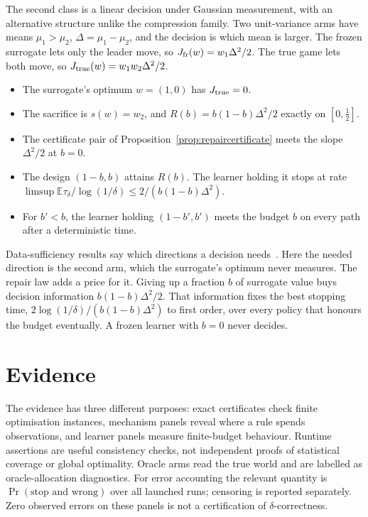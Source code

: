 The second class is a linear decision under Gaussian measurement, with an alternative
structure unlike the compression family. Two unit-variance arms have means $\mu_1>\mu_2$,
$\Delta=\mu_1-\mu_2$, and the decision is which mean is larger. The frozen surrogate lets only
the leader move, so $J_{\rm fr}(w)=w_1\Delta^2/2$. The true game lets both move, so
$J_{\rm true}(w)=w_1w_2\Delta^2/2$.

\begin{proposition}
\label{prop:twoarm}
\begin{itemize}
\item The surrogate's optimum $w=(1,0)$ has $J_{\rm true}=0$.
\item The sacrifice is $s(w)=w_2$, and $R(b)=b(1-b)\Delta^2/2$ exactly on $[0,\frac12]$.
\item The certificate pair of Proposition~\ref{prop:repaircertificate} meets the slope
$\Delta^2/2$ at $b=0$.
\item The design $(1-b,b)$ attains $R(b)$. The learner holding it stops at rate
$\limsup\mathbb E\tau_\delta/\log(1/\delta)\le2/(b(1-b)\Delta^2)$.
\item For $b'<b$, the learner holding $(1-b',b')$ meets the budget $b$ on every path after a
deterministic time.
\end{itemize}
\end{proposition}

Data-sufficiency results say which directions a decision needs~\cite{bennouna2025}. Here the
needed direction is the second arm, which the surrogate's optimum never measures. The repair
law adds a price for it. Giving up a fraction $b$ of surrogate value buys decision information
$b(1-b)\Delta^2/2$. That information fixes the best stopping time,
$2\log(1/\delta)/(b(1-b)\Delta^2)$ to first order, over every policy that honours the budget
eventually. A frozen learner with $b=0$ never decides.

\section{Evidence}
\label{sec:evidence}

The evidence has three different purposes: exact certificates check finite optimisation
instances, mechanism panels reveal where a rule spends observations, and learner panels measure
finite-budget behaviour. Runtime assertions are useful consistency checks, not independent
proofs of statistical coverage or global optimality. Oracle arms read the true world and are
labelled as oracle-allocation diagnostics. For error accounting the relevant quantity is
$\Pr(\text{stop and wrong})$ over all launched runs; censoring is reported separately.
Zero observed errors on these panels is not a certification of $\delta$-correctness.

